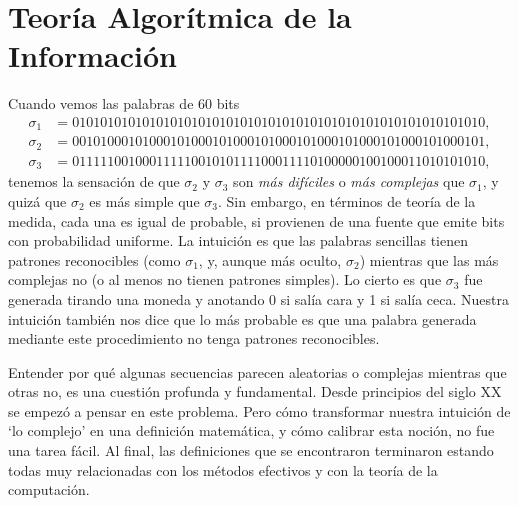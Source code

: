 \section{Teoría Algorítmica de la Información}


Cuando vemos las palabras de 60 bits
\begin{align*}
\sigma_1 &= 01010101010101010101010101010101010101010101010101010101010,\\
\sigma_2 &= 00101000101000101000101000101000101000101000101000101000101,\\
\sigma_3 &= 01111100100011111001010111100011110100000100100011010101010,
\end{align*}
tenemos la sensación de que  $\sigma_2$ y  $\sigma_3$
son {\em más difíciles} o {\em más complejas} que $\sigma_1$, y quizá que $\sigma_2$ es más simple que $\sigma_3$. Sin embargo, en términos de
teoría de la medida, cada una es igual de probable, si provienen de una fuente que emite bits 
con probabilidad uniforme. 
La intuición es que las palabras sencillas tienen patrones reconocibles (como $\sigma_1$, y, aunque más oculto, $\sigma_2$) mientras que las más complejas no (o al menos no tienen patrones simples). Lo cierto es que $\sigma_3$ fue generada tirando una moneda y anotando 0 si salía cara y 1 si salía ceca. Nuestra intuición también nos dice que lo más probable es que una palabra generada mediante este procedimiento no tenga patrones reconocibles.

Entender por qué
algunas secuencias parecen aleatorias o complejas mientras que otras no, es una cuestión
profunda y fundamental. Desde principios del siglo {\small XX} se
empezó a pensar en este problema. Pero cómo transformar nuestra
intuición de `lo complejo' en una definición matemática, y cómo calibrar esta noción, no fue una tarea fácil. 
Al final, las definiciones que se
encontraron terminaron estando todas muy relacionadas con los métodos efectivos y con la 
teoría de la computación.


